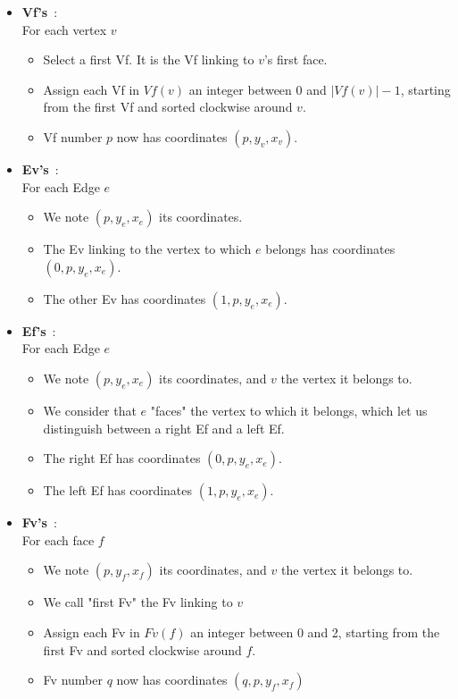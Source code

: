 \documentclass{report}
\begin{document}
\begin{itemize}
	\item \textbf{Vf's}~:\\
	For each vertex $v$
	\begin{itemize}[noitemsep, nosep, label=-]
		\item Select a first Vf. It is the Vf linking to $v$'s first face.
		\item Assign each Vf in $Vf(v)$ an integer between 0 and $|Vf(v)|-1$, starting from the first Vf and sorted clockwise around $v$.
		\item Vf number $p$ now has coordinates $(p, y_v, x_v)$.
	\end{itemize}
	
	\item \textbf{Ev's}~:\\
	For each Edge $e$ 
	\begin{itemize}[noitemsep, nosep, label=-]
		\item We note $(p, y_e, x_e)$ its coordinates.
		\item The Ev linking to the vertex to which $e$ belongs has coordinates $(0, p, y_e, x_e)$.
		\item The other Ev has coordinates $(1, p, y_e, x_e)$.
	\end{itemize}
	
	\item \textbf{Ef's}~:\\
	For each Edge $e$ 
	\begin{itemize}[noitemsep, nosep, label=-]
		\item We note $(p, y_e, x_e)$ its coordinates, and $v$ the vertex it belongs to.
		\item We consider that $e$ "faces" the vertex to which it belongs, which let us distinguish between a right Ef and a left Ef.
		\item The right Ef has coordinates $(0, p, y_e, x_e)$.
		\item The left Ef has coordinates $(1, p, y_e, x_e)$.
	\end{itemize}
	
	\item \textbf{Fv's}~:\\
	For each face $f$ 
	\begin{itemize}[noitemsep, nosep, label=-]
		\item We note $(p, y_f, x_f)$ its coordinates, and $v$ the vertex it belongs to.
		\item We call "first Fv" the Fv linking to $v$
		\item Assign each Fv in $Fv(f)$ an integer between 0 and 2, starting from the first Fv and sorted clockwise around $f$.
		\item Fv number $q$ now has coordinates $(q, p, y_f, x_f)$
	\end{itemize}
	

\end{itemize}
\end{document}
